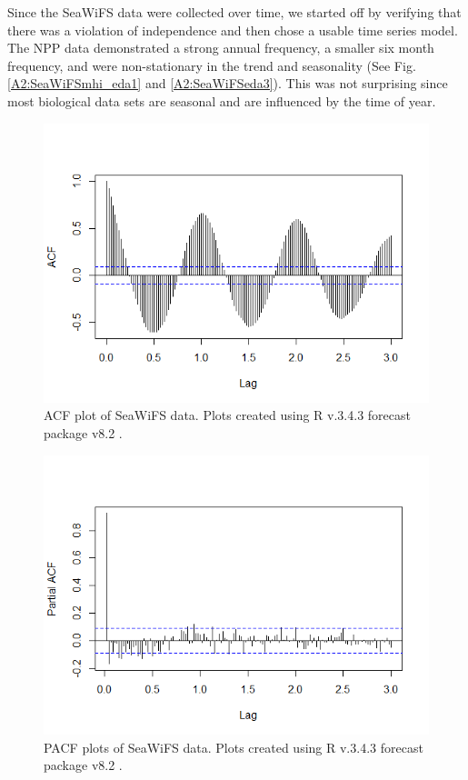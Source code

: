 \documentclass[oneside,12pt,final]{sty/ucthesis-CA2012}
\let\cite\citep                             %
\begin{document}
\begin{mainmatter}
Since the SeaWiFS data were collected over time, we started off by verifying that there was a violation of independence and then chose a usable time series model. The NPP data demonstrated a strong annual frequency, a smaller six month frequency, and were non-stationary in the trend and seasonality (See Fig. \ref{A2:SeaWiFSmhi_eda1}  and \ref{A2:SeaWiFSeda3}). This was not surprising since most biological data sets are seasonal and are influenced by the time of year. 

\begin{figure}[H]
     \centering
       \includegraphics[width=.7\textwidth]{fig/seawifs_acf}
    \caption{ACF plot of SeaWiFS data. Plots created using R v.3.4.3 \cite{Rcite} forecast package v8.2 \cite{forecast1, forecast2}.}
    \label{A2:SeaWiFSeda1}
\end{figure}

\begin{figure}[H]
     \centering
       \includegraphics[width=.7\textwidth]{fig/seawifs_pacf}
    \caption{PACF plots of SeaWiFS data. Plots created using R v.3.4.3 \cite{Rcite} forecast package v8.2 \cite{forecast1, forecast2}.}
    \label{A2:SeaWiFSeda2}
\end{figure}


\end{mainmatter}
\end{document}
